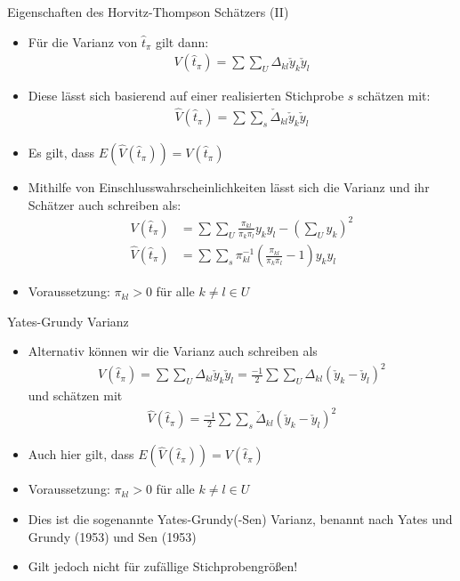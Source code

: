 \documentclass[9pt]{beamer}
\begin{document}
\begin{frame}{Eigenschaften des Horvitz-Thompson Schätzers (II)}
\begin{itemize}
	\item Für die Varianz von $\hat{t}_\pi$ gilt dann:
	\begin{align*}
	V(\hat{t}_\pi)=\sum\sum_U \Delta_{kl} \check{y}_k \check{y}_l
	\end{align*}
	\item Diese lässt sich basierend auf einer realisierten Stichprobe $s$ schätzen mit:
	\begin{align*}
	\hat{V}(\hat{t}_\pi)=\sum\sum_s \check{\Delta}_{kl} \check{y}_k \check{y}_l
	\end{align*}
	\item Es gilt, dass $E(\hat{V}(\hat{t}_\pi))=V(\hat{t}_\pi)$
	\item Mithilfe von Einschlusswahrscheinlichkeiten lässt sich die Varianz und ihr Schätzer auch schreiben als:
	\begin{align*}
	V(\hat{t}_\pi) &= \sum\sum_U \frac{\pi_{kl}}{\pi_k \pi_l}y_k y_l -\left(\sum_U y_k\right)^2\\
	\hat{V}(\hat{t}_\pi) &= \sum\sum_s \pi_{kl}^{-1}\left(\frac{\pi_{kl}}{ \pi_k\pi_l}-1\right) y_k y_l
	\end{align*}
	\item Voraussetzung: $\pi_{kl}>0$ für alle $k \neq l \in U$
\end{itemize}
\end{frame}


\begin{frame}{Yates-Grundy Varianz}
\begin{itemize}
	\item Alternativ können wir die Varianz auch schreiben als
	\begin{align*}
	V(\hat{t}_\pi) = \sum\sum_U \Delta_{kl}\check{y}_k \check{y}_l = \frac{-1}{2} \sum \sum_U \Delta_{kl} \left(\check{y}_{k}-\check{y}_l\right)^2
	\end{align*}
	und schätzen mit
	\begin{align*}	\hat{V}(\hat{t}_\pi) = \frac{-1}{2} \sum \sum_s \check{\Delta}_{kl} \left(\check{y}_{k}-\check{y}_l\right)^2	
	\end{align*}
	\item Auch hier gilt, dass $E(\hat{V}(\hat{t}_\pi))=V(\hat{t}_\pi)$
	\item Voraussetzung: $\pi_{kl}>0$ für alle $k \neq l \in U$
	\item Dies ist die sogenannte Yates-Grundy(-Sen) Varianz, benannt nach Yates und Grundy (1953) und Sen (1953)
	\item Gilt jedoch nicht für zufällige Stichprobengrößen!
\end{itemize}
\end{frame}
\end{document}
